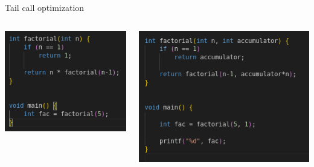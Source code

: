 \documentclass{beamer}
\begin{document}
\begin{frame}{Tail call optimization}
	\begin{columns}
		\begin{column}{.4\textwidth}
		    \includegraphics[width=\textwidth]{not_tco.png}
		\end{column}
		\begin{column}{.5\textwidth}
		    \includegraphics[width=\textwidth]{tco_2.png}
		\end{column}
	\end{columns}
\end{frame}
\end{document}
